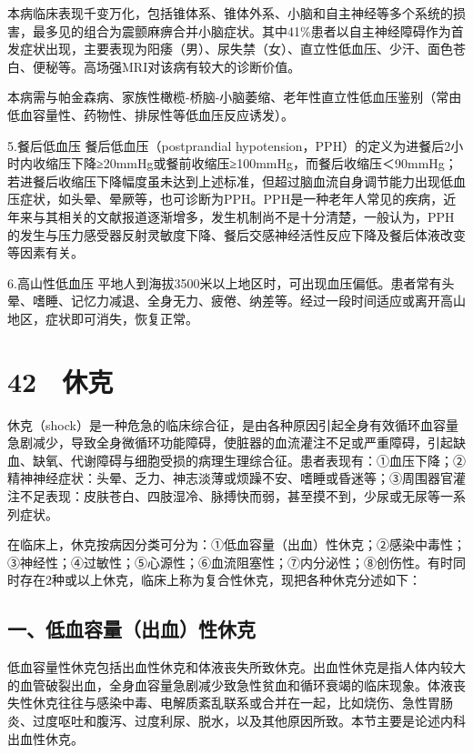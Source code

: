 本病临床表现千变万化，包括锥体系、锥体外系、小脑和自主神经等多个系统的损害，最多见的组合为震颤麻痹合并小脑症状。其中41\%患者以自主神经障碍作为首发症状出现，主要表现为阳痿（男）、尿失禁（女）、直立性低血压、少汗、面色苍白、便秘等。高场强MRI对该病有较大的诊断价值。

本病需与帕金森病、家族性橄榄-桥脑-小脑萎缩、老年性直立性低血压鉴别（常由低血容量性、药物性、排尿性等低血压反应诱发）。

5.餐后低血压 餐后低血压（postprandial
hypotension，PPH）的定义为进餐后2小时内收缩压下降≥20mmHg或餐前收缩压≥100mmHg，而餐后收缩压＜90mmHg；若进餐后收缩压下降幅度虽未达到上述标准，但超过脑血流自身调节能力出现低血压症状，如头晕、晕厥等，也可诊断为PPH。PPH是一种老年人常见的疾病，近年来与其相关的文献报道逐渐增多，发生机制尚不是十分清楚，一般认为，PPH的发生与压力感受器反射灵敏度下降、餐后交感神经活性反应下降及餐后体液改变等因素有关。

6.高山性低血压
平地人到海拔3500米以上地区时，可出现血压偏低。患者常有头晕、嗜睡、记忆力减退、全身无力、疲倦、纳差等。经过一段时间适应或离开高山地区，症状即可消失，恢复正常。

\protect\hypertarget{text00116.html}{}{}

\section{42　休克}

休克（shock）是一种危急的临床综合征，是由各种原因引起全身有效循环血容量急剧减少，导致全身微循环功能障碍，使脏器的血流灌注不足或严重障碍，引起缺血、缺氧、代谢障碍与细胞受损的病理生理综合征。患者表现有：①血压下降；②精神神经症状：头晕、乏力、神志淡薄或烦躁不安、嗜睡或昏迷等；③周围器官灌注不足表现：皮肤苍白、四肢湿冷、脉搏快而弱，甚至摸不到，少尿或无尿等一系列症状。

在临床上，休克按病因分类可分为：①低血容量（出血）性休克；②感染中毒性；③神经性；④过敏性；⑤心源性；⑥血流阻塞性；⑦内分泌性；⑧创伤性。有时同时存在2种或以上休克，临床上称为复合性休克，现把各种休克分述如下：

\subsection{一、低血容量（出血）性休克}

低血容量性休克包括出血性休克和体液丧失所致休克。出血性休克是指人体内较大的血管破裂出血，全身血容量急剧减少致急性贫血和循环衰竭的临床现象。体液丧失性休克往往与感染中毒、电解质紊乱联系或合并在一起，比如烧伤、急性胃肠炎、过度呕吐和腹泻、过度利尿、脱水，以及其他原因所致。本节主要是论述内科出血性休克。

